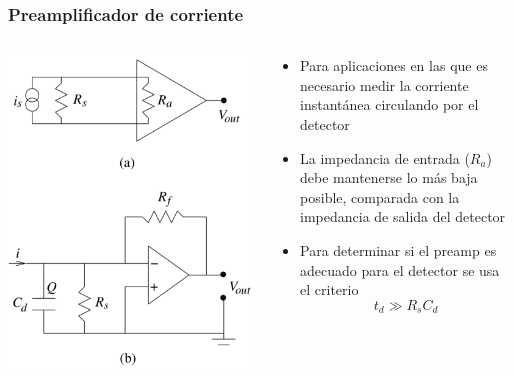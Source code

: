 \documentclass{beamer}
\begin{document}
\begin{frame}
\frametitle{Preamplificador de corriente}
\begin{columns}
\begin{column}{0.4\textwidth}
\includegraphics[width=\textwidth]{d2/preamp_i}
\end{column}
\begin{column}{0.6\textwidth}
\begin{itemize}
\item Para aplicaciones en las que es necesario medir la corriente instantánea
circulando por el detector
\item \alert{La impedancia de entrada ($R_a$) debe mantenerse lo más baja posible,
comparada con la impedancia de salida del detector}
\item Para determinar si el preamp es adecuado para el detector se usa el
criterio $$t_d \gg R_sC_d$$ 

\end{itemize}
\end{column}
\end{columns}
\end{frame}
\end{document}
